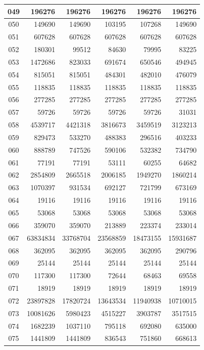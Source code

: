 \begin{longtable}{|c|r|r|r|r|r|}
049 & 196276 & 196276 & 196276 & 196276 & 196276 \\
\hline
050 & 149690 & 149690 & 103195 & 107268 & 149690 \\
\hline
051 & 607628 & 607628 & 607628 & 607628 & 607628 \\
\hline
052 & 180301 & 99512 & 84630 & 79995 & 83225 \\
\hline
053 & 1472686 & 823033 & 691674 & 650546 & 494945 \\
\hline
054 & 815051 & 815051 & 484301 & 482010 & 476079 \\
\hline
055 & 118835 & 118835 & 118835 & 118835 & 118835 \\
\hline
056 & 277285 & 277285 & 277285 & 277285 & 277285 \\
\hline
057 & 59726 & 59726 & 59726 & 59726 & 31031 \\
\hline
058 & 4539717 & 4421318 & 3816673 & 3459519 & 3123213 \\
\hline
059 & 829473 & 533270 & 488383 & 296516 & 403233 \\
\hline
060 & 888789 & 747526 & 590106 & 532382 & 734790 \\
\hline
061 & 77191 & 77191 & 53111 & 60255 & 64682 \\
\hline
062 & 2854809 & 2665518 & 2006185 & 1949270 & 1860214 \\
\hline
063 & 1070397 & 931534 & 692127 & 721799 & 673169 \\
\hline
064 & 19116 & 19116 & 19116 & 19116 & 19116 \\
\hline
065 & 53068 & 53068 & 53068 & 53068 & 53068 \\
\hline
066 & 359070 & 359070 & 213889 & 223374 & 233014 \\
\hline
067 & 63834834 & 33768704 & 23568859 & 18473155 & 15931687 \\
\hline
068 & 362095 & 362095 & 362095 & 362095 & 290796 \\
\hline
069 & 25144 & 25144 & 25144 & 25144 & 25144 \\
\hline
070 & 117300 & 117300 & 72644 & 68463 & 69558 \\
\hline
071 & 18919 & 18919 & 18919 & 18919 & 18919 \\
\hline
072 & 23897828 & 17820724 & 13643534 & 11940938 & 10710015 \\
\hline
073 & 10081626 & 5980423 & 4515227 & 3903787 & 3517515 \\
\hline
074 & 1682239 & 1037110 & 795118 & 692080 & 635000 \\
\hline
075 & 1441809 & 1441809 & 836543 & 751860 & 668613 \\

\end{longtable}
